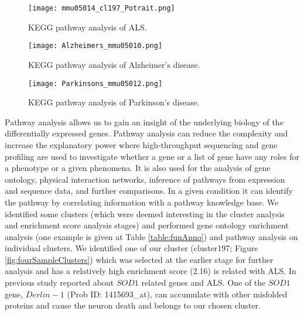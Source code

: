\begin{figure}
 \begin{center}
 \texttt{[image: mmu05014\_cl197\_Potrait.png]}
\caption {KEGG pathway analysis of ALS. \label{pathwayAnalysis}}
 \end{center}
\end{figure}
\begin{figure}
 \begin{center}
 \texttt{[image: Alzheimers\_mmu05010.png]}
\caption {KEGG pathway analysis of Alzheimer's disease. \label{AlzheimerPathwayAnalysis}}
 \end{center}
\end{figure}
\begin{figure}
 \begin{center}
 \texttt{[image: Parkinsons\_mmu05012.png]}
\caption {KEGG pathway analysis of Parkinson's disease. \label{ParkinsonPathwayAnalysis}}
 \end{center}
\end{figure}
Pathway analysis allows us to gain an insight of the underlying biology of the differentially expressed genes. Pathway analysis can reduce the complexity and increase the explanatory power where high-throughput sequencing and gene profiling are used to investigate whether a gene or a list of gene have any roles for a phenotype or a given phenomena. It is also used for the analysis of gene ontology, physical interaction networks, inference of pathways from expression and sequence data, and further comparisons. In a given condition it can identify the pathway by correlating information with a pathway knowledge base. We identified some clusters (which were deemed interesting in the cluster analysis and enrichment score analysis stages) and performed gene ontology enrichment analysis (one example is given at Table \ref{table:funAnno}) and pathway analysis on individual clusters.  We identified one of our cluster (cluster197; Figure \ref{fig:fourSampleClusters}) which was selected at the earlier stage for further analysis and has a relatively high enrichment score (2.16) is related with ALS.  In previous study \cite{Brockington:2013} reported about $SOD1$ related genes and ALS.  One of the $SOD1$ gene, $Derlin-1$ (Prob ID: 1415693_at), can accumulate with other misfolded proteins and cause the neuron death and belongs to our chosen cluster. 


